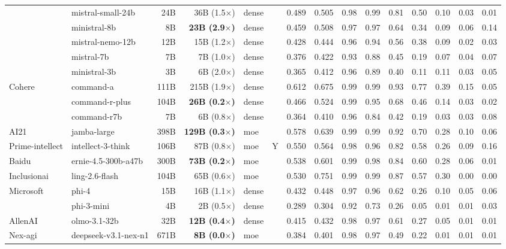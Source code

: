 \begin{longtable}{@{}ll r r l c rr rrrrrrr@{}}
 & mistral-small-24b & 24B & 36B (1.5$\times$) & dense &  & 0.489 & 0.505 & 0.98 & 0.99 & 0.81 & 0.50 & 0.10 & 0.03 & 0.01 \\
 & ministral-8b & 8B & \textbf{23B (2.9$\times$)} & dense &  & 0.459 & 0.508 & 0.97 & 0.97 & 0.64 & 0.34 & 0.09 & 0.06 & 0.14 \\
 & mistral-nemo-12b & 12B & 15B (1.2$\times$) & dense &  & 0.428 & 0.444 & 0.96 & 0.94 & 0.56 & 0.38 & 0.09 & 0.02 & 0.03 \\
 & mistral-7b & 7B & 7B (1.0$\times$) & dense &  & 0.376 & 0.422 & 0.93 & 0.88 & 0.45 & 0.19 & 0.07 & 0.04 & 0.07 \\
 & ministral-3b & 3B & 6B (2.0$\times$) & dense &  & 0.365 & 0.412 & 0.96 & 0.89 & 0.40 & 0.11 & 0.11 & 0.03 & 0.05 \\
Cohere & command-a & 111B & 215B (1.9$\times$) & dense &  & 0.612 & 0.675 & 0.99 & 0.99 & 0.93 & 0.77 & 0.39 & 0.15 & 0.05 \\
 & command-r-plus & 104B & \textbf{26B (0.2$\times$)} & dense &  & 0.466 & 0.524 & 0.99 & 0.95 & 0.68 & 0.46 & 0.14 & 0.03 & 0.02 \\
 & command-r7b & 7B & 6B (0.8$\times$) & dense &  & 0.364 & 0.410 & 0.96 & 0.84 & 0.42 & 0.19 & 0.03 & 0.03 & 0.08 \\
AI21 & jamba-large & 398B & \textbf{129B (0.3$\times$)} & moe &  & 0.578 & 0.639 & 0.99 & 0.99 & 0.92 & 0.70 & 0.28 & 0.10 & 0.06 \\
Prime-intellect & intellect-3-think & 106B & 87B (0.8$\times$) & moe & Y & 0.550 & 0.564 & 0.98 & 0.96 & 0.82 & 0.58 & 0.26 & 0.09 & 0.16 \\
Baidu & ernie-4.5-300b-a47b & 300B & \textbf{73B (0.2$\times$)} & moe &  & 0.538 & 0.601 & 0.99 & 0.98 & 0.84 & 0.60 & 0.28 & 0.06 & 0.01 \\
Inclusionai & ling-2.6-flash & 104B & 65B (0.6$\times$) & moe &  & 0.530 & 0.751 & 0.99 & 0.99 & 0.87 & 0.57 & 0.30 & 0.00 & 0.00 \\
Microsoft & phi-4 & 15B & 16B (1.1$\times$) & dense &  & 0.432 & 0.448 & 0.97 & 0.96 & 0.62 & 0.26 & 0.10 & 0.05 & 0.06 \\
 & phi-3-mini & 4B & 2B (0.5$\times$) & dense &  & 0.289 & 0.304 & 0.92 & 0.73 & 0.26 & 0.05 & 0.01 & 0.01 & 0.03 \\
AllenAI & olmo-3.1-32b & 32B & \textbf{12B (0.4$\times$)} & dense &  & 0.415 & 0.432 & 0.98 & 0.97 & 0.61 & 0.27 & 0.05 & 0.01 & 0.01 \\
Nex-agi & deepseek-v3.1-nex-n1 & 671B & \textbf{8B (0.0$\times$)} & moe &  & 0.384 & 0.401 & 0.98 & 0.97 & 0.49 & 0.22 & 0.01 & 0.01 & 0.01 \\

\end{longtable}
